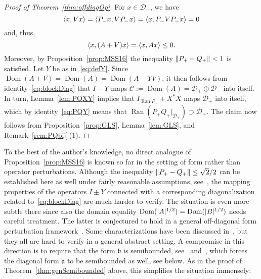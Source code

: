 \documentclass[11pt,a4paper]{amsart}
\numberwithin{equation}{section}
\DeclareMathOperator{\Ran}{Ran}
\DeclareMathOperator{\Dom}{Dom}
\DeclarePairedDelimiter{\abs}{|}{|}
\DeclarePairedDelimiter{\norm}{\lVert}{\rVert}
\DeclarePairedDelimiter{\scprod}{\langle}{\rangle}
\newcommand{\cC}{{\mathcal C}}
\newcommand{\cD}{{\mathcal D}}
\newcommand{\fa}{{\mathfrak a}}
\newcommand{\fb}{{\mathfrak b}}
\theoremstyle{plain}
\theoremstyle{definition}
\theoremstyle{remark}
\begin{document}
\begin{proof}[Proof of Theorem~\ref{thm:offdiagOp}]
  For $x \in \cD_-$, we have
  \begin{equation*}
    \scprod{ x , Vx }
    =
    \scprod{ P_-x , VP_-x }
    =
    \scprod{ x , P_-VP_-x }
    =
    0
  \end{equation*}
  and, thus,
  \begin{equation*}
    \scprod{ x , (A+V)x }
    =
    \scprod{ x , Ax }
    \le
    0
    .
  \end{equation*}
  Moreover, by Proposition~\ref{prop:MSS16} the inequality $\norm{P_+-Q_+}<1$ is satisfied. Let $Y$ be as in~\eqref{eq:defY}.
  Since $\Dom(A+V)=\Dom(A)=\Dom(A-YV)$, it then follows from identity~\eqref{eq:blockDiag} that $I-Y$ maps
  $\cC := \Dom(A) = \cD_+ \oplus \cD_-$ into itself. In turn, Lemma~\ref{lem:PQXY} implies that $I_{\Ran P_+} + X^*X$ maps
  $\cD_+$ into itself, which by identity~\eqref{eq:PQY} means that $\Ran(P_+Q_+|_{\cD_+}) \supset \cD_+$. The claim now follows
  from Proposition~\ref{prop:GLS}, Lemma~\ref{lem:GLS}, and Remark~\ref{rem:PQbij}\,(1).
\end{proof}

To the best of the author's knowledge, no direct analogue of Proposition~\ref{prop:MSS16} is known so far in the setting of form
rather than operator perturbations. Although the inequality $\norm{P_+-Q_+} \le \sqrt{2}/2$ can be established here as well under
fairly reasonable assumptions, see~\cite[Theorem~3.3]{GKMSV17}, the mapping properties of the operators $I \pm Y$ connected with
a corresponding diagonalization related to~\eqref{eq:blockDiag} are much harder to verify. The situation is even more subtle
there since also the domain equality $\Dom(\abs{A}^{1/2}) = \Dom(\abs{B}^{1/2})$ needs careful treatment. The latter is
conjectured to hold in a general off-diagonal form perturbation framework~\cite[Remark~2.7]{GKMV13}. Some characterizations have
been discussed in~\cite[Theorem~3.8]{Schm15}, but they all are hard to verify in a general abstract setting. A compromise in this
direction is to require that the form $\fb$ is semibounded, see~\cite[Lemma~3.9]{Schm15} and~\cite[Lemma~2.7]{GKMSV17}, which
forces the diagonal form $\fa$ to be semibounded as well, see below. As in the proof of Theorem~\ref{thm:genSemibounded} above,
this simplifies the situation immensely:
\end{document}
